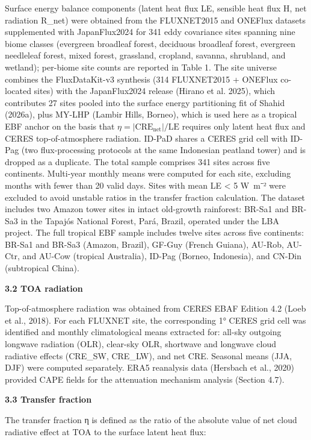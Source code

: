 Surface energy balance components (latent heat flux LE, sensible heat
flux H, net radiation R\_net) were obtained from the FLUXNET2015 and
ONEFlux datasets supplemented with JapanFlux2024 for 341 eddy covariance sites spanning nine biome
classes (evergreen broadleaf forest, deciduous broadleaf forest,
evergreen needleleaf forest, mixed forest, grassland, cropland, savanna,
shrubland, and wetland); per-biome site counts are reported in Table 1. The site universe combines the FluxDataKit-v3 synthesis (314 FLUXNET2015 + ONEFlux co-located sites) with the JapanFlux2024 release (Hirano et al. 2025), which contributes 27 sites pooled into the surface energy partitioning fit of Shahid (2026a), plus MY-LHP (Lambir Hills, Borneo), which is used here as a tropical EBF anchor on the basis that $\eta = |\text{CRE}_{\text{net}}|/\text{LE}$ requires only latent heat flux and CERES top-of-atmosphere radiation. ID-PaD shares a CERES grid cell with ID-Pag (two flux-processing protocols at the same Indonesian peatland tower) and is dropped as a duplicate. The total sample comprises 341 sites across five continents.
Multi-year monthly
means were computed for each site, excluding months with fewer than 20
valid days. Sites with mean LE \textless{} 5 W~m⁻² were excluded to
avoid unstable ratios in the transfer fraction calculation. The dataset
includes two Amazon tower sites in intact old-growth rainforest: BR-Sa1
and BR-Sa3 in the Tapajós National Forest, Pará, Brazil, operated under
the LBA project. The full tropical EBF sample includes twelve sites
across five continents: BR-Sa1 and BR-Sa3 (Amazon, Brazil), GF-Guy
(French Guiana), AU-Rob, AU-Ctr, and AU-Cow (tropical Australia), ID-Pag
(Borneo, Indonesia), and CN-Din (subtropical China).

\textbf{3.2 TOA radiation}

Top-of-atmosphere radiation was obtained from CERES EBAF Edition 4.2
(Loeb et al., 2018). For each FLUXNET site, the corresponding 1° CERES
grid cell was identified and monthly climatological means extracted for:
all-sky outgoing longwave radiation (OLR), clear-sky OLR, shortwave and
longwave cloud radiative effects (CRE\_SW, CRE\_LW), and net CRE.
Seasonal means (JJA, DJF) were computed separately. ERA5 reanalysis data
(Hersbach et al., 2020) provided CAPE fields for the attenuation
mechanism analysis (Section 4.7).

\textbf{3.3 Transfer fraction}

The transfer fraction η is defined as the ratio of the absolute value of
net cloud radiative effect at TOA to the surface latent heat flux:

